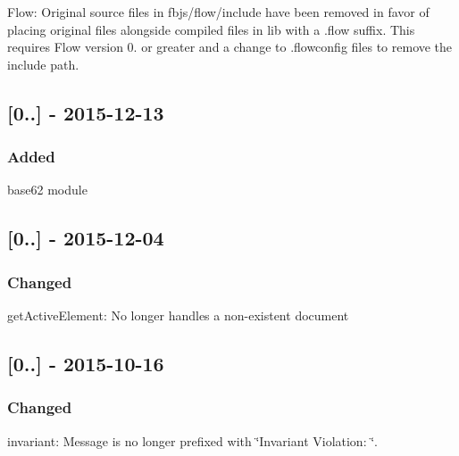 \begin{DoxyItemize}
\item Flow\+: Original source files in {\ttfamily fbjs/flow/include} have been removed in favor of placing original files alongside compiled files in lib with a {\ttfamily .flow} suffix. This requires Flow version 0. or greater and a change to {\ttfamily .flowconfig} files to remove the include path.
\end{DoxyItemize}

\subsection*{\mbox{[}0..\mbox{]} -\/ 2015-\/12-\/13}

\subsubsection*{Added}


\begin{DoxyItemize}
\item {\ttfamily base62} module
\end{DoxyItemize}

\subsection*{\mbox{[}0..\mbox{]} -\/ 2015-\/12-\/04}

\subsubsection*{Changed}


\begin{DoxyItemize}
\item {\ttfamily get\+Active\+Element}\+: No longer handles a non-\/existent {\ttfamily document}
\end{DoxyItemize}

\subsection*{\mbox{[}0..\mbox{]} -\/ 2015-\/10-\/16}

\subsubsection*{Changed}


\begin{DoxyItemize}
\item {\ttfamily invariant}\+: Message is no longer prefixed with \char`\"{}\+Invariant Violation\+: \char`\"{}.
\end{DoxyItemize}

